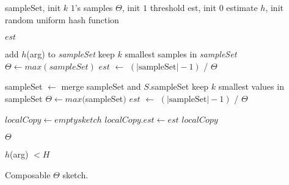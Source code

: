 \begin{algorithm}[htb]
    \small
    \begin{algorithmic}[1]
        \Vars
        \State   sampleSet, init $k$ $1$'s \Comment samples
        \State  $\Theta$, init $1$			\Comment threshold
         est, init $0$ \Comment estimate
        \State $h$, init random uniform hash function 
        \EndFor
        
        \State \Return $est$ \label{l:query}
        \EndProcedure
        
         \Return
        \EndIf
        \State add $h$(arg) to \emph{sampleSet}
        \State keep $k$ smallest samples in \emph{sampleSet}
        \State $\Theta \leftarrow max(sampleSet)$
        \State $\mathit{est}$ $\leftarrow $ $\left( |\text{sampleSet}|-1 \right)$ / $\Theta$
        \EndProcedure

        \State sampleSet $\leftarrow$ merge sampleSet and $S$.sampleSet
        \State keep $k$ smallest values in sampleSet
        \State $\Theta \leftarrow max($sampleSet$)$
        \State $\mathit{est}$ $\leftarrow $ $\left( |\text{sampleSet}|-1 \right)$ / $\Theta$ \label{l:update-est}
        \EndProcedure
        
            \State $localCopy \leftarrow empty sketch$
            \State $localCopy.\mathit{est} \leftarrow \mathit{est}$
            \State \Return $localCopy$
        \EndProcedure
    
            \State \Return $\Theta$
        \EndProcedure
    
            \State \Return $h$(arg) $< H$
        \EndProcedure

    \end{algorithmic}
    \caption{Composable $\Theta$ sketch.}
    \label{alg:composable-theta}
\end{algorithm}

